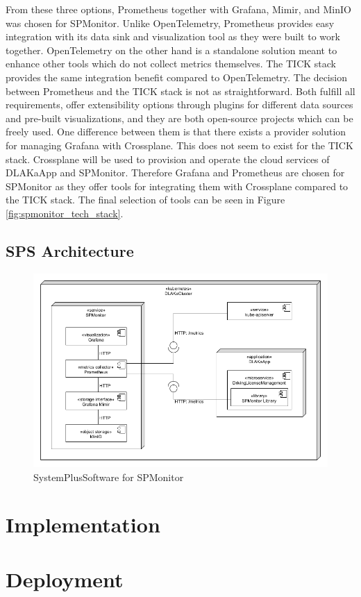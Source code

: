 From these three options, Prometheus together with Grafana, Mimir, and MinIO was chosen for SPMonitor.
Unlike OpenTelemetry, Prometheus provides easy integration with its data sink and visualization tool as
they were built to work together. OpenTelemetry on the other hand is a standalone solution meant to enhance
other tools which do not collect metrics themselves. The TICK stack provides the same integration benefit compared
to OpenTelemetry. The decision between Prometheus and the TICK stack is not as straightforward.
Both fulfill all requirements, offer extensibility options through plugins for different data sources
and pre-built visualizations, and they are both open-source projects which can be freely used.
One difference between them is that there exists a provider solution for managing Grafana with Crossplane.
This does not seem to exist for the TICK stack. Crossplane will be used to provision and operate the cloud
services of \Gls{DLAKaApp} and SPMonitor. Therefore Grafana and Prometheus are chosen for SPMonitor as they offer tools
for integrating them with Crossplane compared to the TICK stack. The final selection of tools can be seen in Figure \ref{fig:spmonitor_tech_stack}.

\subsection{SPS Architecture}

\begin{figure}[h]
	\centering
	\includegraphics[width=\textwidth]{figures/sps_spmonitor.png}
	\caption{SystemPlusSoftware for SPMonitor}
	\label{fig:sps_spmonitor}
\end{figure}

\section{Implementation}


\section{Deployment}

